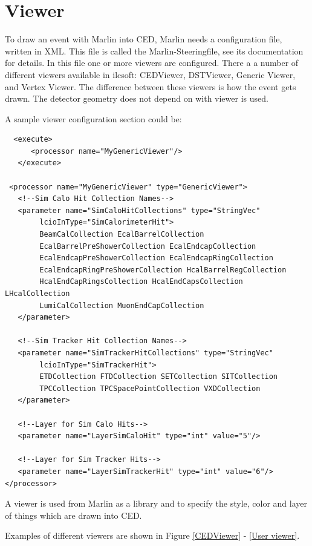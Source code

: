 \documentclass[a4paper,10pt]{article}
\begin{document}
\section{Viewer}
To draw an event with Marlin into CED, Marlin needs a configuration file, written in XML. This file is called the Marlin-Steeringfile, see its documentation for details. In this file one or more viewers are configured. There a a number of different viewers available in ilcsoft: CEDViewer, DSTViewer, Generic Viewer, and Vertex Viewer. The difference between these viewers is how the event gets drawn. The detector geometry does not depend on with viewer is used. 

A sample viewer configuration section could be:
 \begin{verbatim}
  <execute>
      <processor name="MyGenericViewer"/>
   </execute>

 <processor name="MyGenericViewer" type="GenericViewer">
   <!--Sim Calo Hit Collection Names-->
   <parameter name="SimCaloHitCollections" type="StringVec"
        lcioInType="SimCalorimeterHit"> 
        BeamCalCollection EcalBarrelCollection
        EcalBarrelPreShowerCollection EcalEndcapCollection 
        EcalEndcapPreShowerCollection EcalEndcapRingCollection 
        EcalEndcapRingPreShowerCollection HcalBarrelRegCollection 
        HcalEndCapRingsCollection HcalEndCapsCollection LHcalCollection 
        LumiCalCollection MuonEndCapCollection 
   </parameter>
   
   <!--Sim Tracker Hit Collection Names-->
   <parameter name="SimTrackerHitCollections" type="StringVec" 
        lcioInType="SimTrackerHit"> 
        ETDCollection FTDCollection SETCollection SITCollection 
        TPCCollection TPCSpacePointCollection VXDCollection 
   </parameter>

   <!--Layer for Sim Calo Hits-->
   <parameter name="LayerSimCaloHit" type="int" value="5"/>
   
   <!--Layer for Sim Tracker Hits-->
   <parameter name="LayerSimTrackerHit" type="int" value="6"/>
</processor>

 \end{verbatim}
A viewer is used from Marlin as a library and to specify the style, color and layer of things which are drawn into CED.

Examples of different viewers are shown in Figure \ref{CEDViewer} - \ref{User viewer}. 
\end{document}
